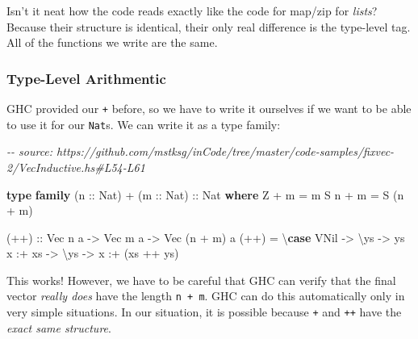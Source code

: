 \documentclass[]{article}
\newenvironment{Shaded}{}{}
\newcommand{\CommentTok}[1]{\textcolor[rgb]{0.38,0.63,0.69}{\textit{#1}}}
\newcommand{\DataTypeTok}[1]{\textcolor[rgb]{0.56,0.13,0.00}{#1}}
\newcommand{\KeywordTok}[1]{\textcolor[rgb]{0.00,0.44,0.13}{\textbf{#1}}}
\newcommand{\NormalTok}[1]{#1}
\newcommand{\OperatorTok}[1]{\textcolor[rgb]{0.40,0.40,0.40}{#1}}
\newcommand{\OtherTok}[1]{\textcolor[rgb]{0.00,0.44,0.13}{#1}}
\begin{document}
Isn't it neat how the code reads exactly like the code for map/zip for
\emph{lists}? Because their structure is identical, their only real difference
is the type-level tag. All of the functions we write are the same.

\subsubsection{Type-Level Arithmentic}\label{type-level-arithmentic}

GHC provided our \texttt{+} before, so we have to write it ourselves if we want
to be able to use it for our \texttt{Nat}s. We can write it as a type family:

\begin{Shaded}
\begin{Highlighting}[]
\CommentTok{{-}{-} source: https://github.com/mstksg/inCode/tree/master/code{-}samples/fixvec{-}2/VecInductive.hs\#L54{-}L61}

\KeywordTok{type} \KeywordTok{family}\NormalTok{ (}\OtherTok{n ::} \DataTypeTok{Nat}\NormalTok{) }\OperatorTok{+}\NormalTok{ (}\OtherTok{m ::} \DataTypeTok{Nat}\NormalTok{)}\OtherTok{ ::} \DataTypeTok{Nat} \KeywordTok{where}
    \DataTypeTok{\textquotesingle{}Z}   \OperatorTok{+}\NormalTok{ m }\OtherTok{=}\NormalTok{ m}
    \DataTypeTok{\textquotesingle{}S}\NormalTok{ n }\OperatorTok{+}\NormalTok{ m }\OtherTok{=} \DataTypeTok{\textquotesingle{}S}\NormalTok{ (n }\OperatorTok{+}\NormalTok{ m)}

\OtherTok{(++) ::} \DataTypeTok{Vec}\NormalTok{ n a }\OtherTok{{-}\textgreater{}} \DataTypeTok{Vec}\NormalTok{ m a }\OtherTok{{-}\textgreater{}} \DataTypeTok{Vec}\NormalTok{ (n }\OperatorTok{+}\NormalTok{ m) a}
\NormalTok{(}\OperatorTok{++}\NormalTok{) }\OtherTok{=}\NormalTok{ \textbackslash{}}\KeywordTok{case}
    \DataTypeTok{VNil}    \OtherTok{{-}\textgreater{}}\NormalTok{ \textbackslash{}ys }\OtherTok{{-}\textgreater{}}\NormalTok{ ys}
\NormalTok{    x }\OperatorTok{:+}\NormalTok{ xs }\OtherTok{{-}\textgreater{}}\NormalTok{ \textbackslash{}ys }\OtherTok{{-}\textgreater{}}\NormalTok{ x }\OperatorTok{:+}\NormalTok{ (xs }\OperatorTok{++}\NormalTok{ ys)}
\end{Highlighting}
\end{Shaded}

This works! However, we have to be careful that GHC can verify that the final
vector \emph{really does} have the length \texttt{n\ +\ m}. GHC can do this
automatically only in very simple situations. In our situation, it is possible
because \texttt{+} and \texttt{++} have the \emph{exact same structure}.
\end{document}

